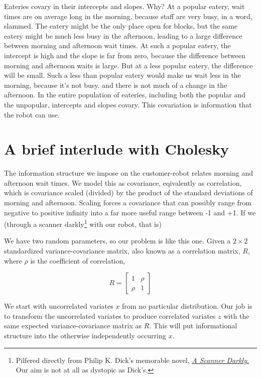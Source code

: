 \documentclass[
]{book}
\begin{document}
Eateries covary in their intercepts and slopes. Why? At a popular eatery, wait times are on average long in the morning, because staff are very busy, in a word, slammed. The eatery might be the only place open for blocks, but the same eatery might be much less busy in the afternoon, leading to a large difference between morning and afternoon wait times. At such a popular eatery, the intercept is high and the slope is far from zero, because the difference between morning and afternoon waits is large. But at a less popular eatery, the difference will be small. Such a less than popular eatery would make us wait less in the morning, because it's not busy. and there is not much of a change in the afternoon. In the entire population of eateries, including both the popular and the unpopular, intercepts and slopes covary. This covariation is information that the robot can use.

\hypertarget{a-brief-interlude-with-cholesky}{%
\section{A brief interlude with Cholesky}\label{a-brief-interlude-with-cholesky}}

The information structure we impose on the customer-robot relates morning and afternoon wait times. We model this as covariance, eqivalently as correlation, which is covariance scaled (divided) by the product of the standard deviations of morning and afternoon. Scaling forces a covariance that can possibly range from negative to positive infinity into a far more useful range between -1 and +1. If we (through a scanner darkly\footnote{Pilfered directly from Philip K. Dick's memorable novel, \href{https://en.wikipedia.org/wiki/A_Scanner_Darkly}{\emph{A Scanner Darkly}.} Our aim is not at all as dystopic as Dick's.} with our robot, that is)

We have two random parameters, so our problem is like this one. Given a \(2 \times 2\) standardized variance-covariance matrix, also known as a correlation matrix, \(R\), where \(\rho\) is the coefficient of correlation,

\[
R =
\begin{bmatrix}
1 & \rho \\
\rho & 1
\end{bmatrix}
\]

We start with uncorrelated variates \(x\) from no particular distribution. Our job is to transform the uncorrelated variates to produce correlated variates \(z\) with the same expected variance-covariance matrix as \(R\). This will put informational structure into the otherwise independently occurring \(x\).
\end{document}
